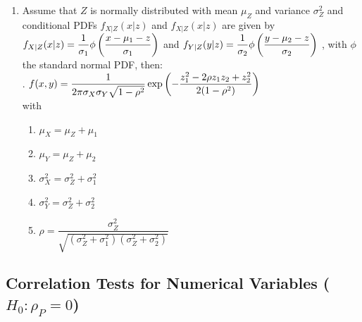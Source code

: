 \begin{enumerate}
    \item Assume that $Z$ is normally distributed with mean $\mu_Z$ and variance $\sigma^2_Z$ and conditional PDFs $f_{X|Z} (x|z)$ and $f_{X|Z} (x|z)$ are given by $f_{X|Z} (x|z) = \dfrac{1}{\sigma_1} \phi\left(\dfrac{x - \mu_1 - z}{\sigma_1}\right)$ and $f_{Y |Z} (y|z) = \dfrac{1}{\sigma_2} \phi\left(\dfrac{y - \mu_2 - z}{\sigma_2}\right)$ , with $\phi$ the standard normal PDF, then:
    \hfill \cite{statistics/book/Statistics-for-Data-Scientists/Maurits-Kaptein}
    \\
    .\hfill
    $
        f (x, y)
        = \dfrac{1}{ 2\pi\sigma_X \sigma_Y \sqrt{1 - \rho^2} }
        \exp \left(
            - \dfrac{z^2_1 - 2\rho z_1z_2 + z^2_2 }{2(1 - \rho^2)}
        \right)
    $
    \hfill \cite{statistics/book/Statistics-for-Data-Scientists/Maurits-Kaptein}
    \\
    with
    \begin{multicols}{2}
    \begin{enumerate}
        \item $\mu_X = \mu_Z + \mu_1$
        \hfill \cite{statistics/book/Statistics-for-Data-Scientists/Maurits-Kaptein}

        \item $\mu_Y = \mu_Z + \mu_2$
        \hfill \cite{statistics/book/Statistics-for-Data-Scientists/Maurits-Kaptein}

        \item $\sigma^2_X = \sigma^2_Z + \sigma^2_1$
        \hfill \cite{statistics/book/Statistics-for-Data-Scientists/Maurits-Kaptein}

        \item $\sigma^2_Y = \sigma^2_Z + \sigma^2_2$
        \hfill \cite{statistics/book/Statistics-for-Data-Scientists/Maurits-Kaptein}

        \item $\rho = \dfrac{\sigma^2_Z }{\sqrt{(\sigma^2_Z + \sigma^2_1 )(\sigma^2_Z + \sigma^2_2 )}}$
        \hfill \cite{statistics/book/Statistics-for-Data-Scientists/Maurits-Kaptein}
    \end{enumerate}
    \end{multicols}
\end{enumerate}




\subsection{Correlation Tests for Numerical Variables ($H_0 : \rho_P = 0 $)}

